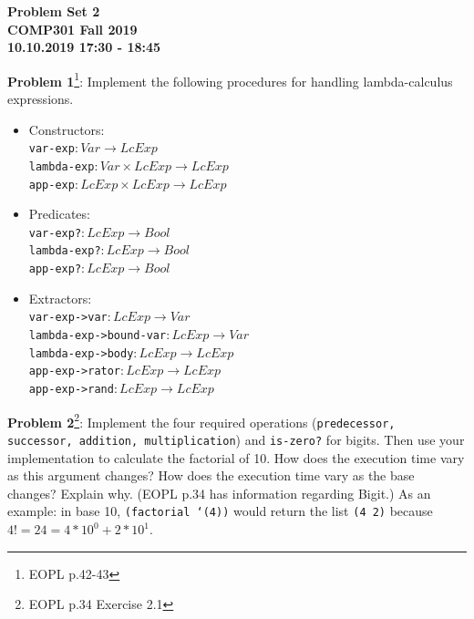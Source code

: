 \documentclass[12pt,reqno]{amsart}
\newcommand{\code}[1]{\texttt{#1}}
\begin{document}
\begin{center}
\large\textbf{Problem Set 2 \\ COMP301 Fall 2019} \\
\normalsize\textbf{10.10.2019 17:30 - 18:45} \\
\end{center}

\vspace{7.5mm}

\textbf{Problem 1}\footnote{EOPL p.42-43}: Implement the following procedures for handling lambda-calculus expressions.
\begin{itemize}
	\item Constructors: \\
		 \code{var-exp}$: Var \xrightarrow{} LcExp$ \\
		 \code{lambda-exp}$: Var \times LcExp \xrightarrow{} LcExp$ \\
		 \code{app-exp}$: LcExp \times LcExp \xrightarrow{} LcExp$
	\item Predicates: \\
		 \code{var-exp?}$: LcExp \xrightarrow{} Bool$ \\
		 \code{lambda-exp?}$: LcExp \xrightarrow{} Bool$ \\
		 \code{app-exp?}$: LcExp \xrightarrow{} Bool$
	\item Extractors: \\
		 \code{var-exp->var}$: LcExp \xrightarrow{} Var$ \\
		 \code{lambda-exp->bound-var}$: LcExp \xrightarrow{} Var$ \\
		 \code{lambda-exp->body}$: LcExp \xrightarrow{} LcExp$ \\
		 \code{app-exp->rator}$: LcExp \xrightarrow{} LcExp$ \\
		 \code{app-exp->rand}$: LcExp \xrightarrow{} LcExp$
\end{itemize}

\vspace{7.5mm}

\textbf{Problem 2}\footnote{EOPL p.34 Exercise 2.1}: Implement the four required operations (\code{predecessor, successor, addition, multiplication}) and \code{is-zero?} for bigits. Then use your implementation to calculate the factorial of 10. How does the execution time vary as this argument changes? How does the execution time vary as the base changes? Explain why. (EOPL p.34 has information regarding Bigit.) As an example: in base 10, \code{(factorial `(4))} would return the list \code{(4 2)} because $4! = 24 = 4*10^0 + 2*10^1$.
\end{document}
